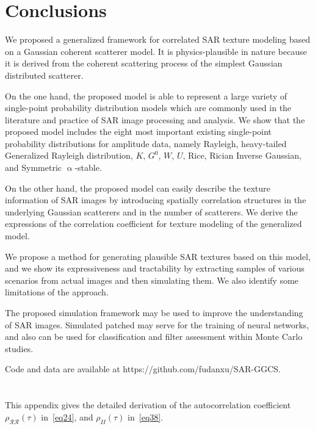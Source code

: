 \documentclass[journal]{IEEEtran}
\begin{document}
\section{Conclusions}\label{Sec:Conclusions}

We proposed a generalized framework for correlated SAR texture modeling based on a Gaussian coherent scatterer model.
It is physics-plausible in nature because it is derived from the coherent scattering process of the simplest Gaussian distributed scatterer.

On the one hand, the proposed model is able to represent a large variety of single-point probability distribution models which are commonly used in the literature and practice of SAR image processing and analysis.
We show that the proposed model includes the eight most important existing single-point probability distributions for amplitude data, namely
Rayleigh,
heavy-tailed Generalized Rayleigh distribution,
$K$,
$G^0$,
$W$,
$U$,
Rice,
Rician Inverse Gaussian, and
Symmetric $\upalpha$-stable.

On the other hand, the proposed model can easily describe the texture information of SAR images by introducing spatially correlation structures in the underlying Gaussian scatterers and in the number of scatterers.
We derive the expressions of the correlation coefficient for texture modeling of the generalized model.

We propose a method for generating plausible SAR textures based on this model, and we show its expressiveness and tractability by extracting samples of various scenarios from actual images and then simulating them.
We also identify some limitations of the approach.

The proposed simulation framework may be used to improve the understanding of SAR images.
Simulated patched may serve for the training of neural networks, and also can be used for classification and filter assessment within Monte Carlo studies.

Code and data are available at https://github.com/fudanxu/SAR-GGCS.

\appendices
\section{}

This appendix gives the detailed derivation of the autocorrelation coefficient $\rho_{\mathcal{R} \mathcal{R}}(\tau)$ in~\eqref{eq24}, and $\rho_{I I}(\tau)$ in~\eqref{eq38}.
\setcounter{equation}{0}
\renewcommand\theequation{A.\arabic{equation}}
\end{document}
